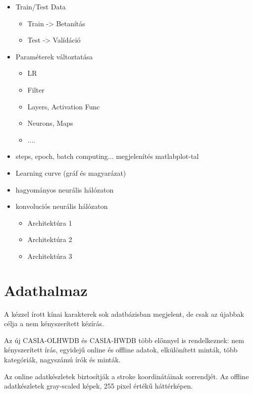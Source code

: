 
\begin{itemize}
\item Train/Test Data
	\begin{itemize}
	\item Train -> Betanítás
	\item Test -> Valídáció	
	\end{itemize}
\end{itemize}

\begin{itemize}
\item Paraméterek változtatása
	\begin{itemize}
	\item LR
	\item Filter
	\item Layers, Activation Func
	\item Neurons, Maps
	\item ....
	\end{itemize}
\item steps, epoch, batch computing... megjelenítés matlabplot-tal
\item Learning curve (gráf és magyarázat)
\end{itemize}

\begin{itemize}
\item hagyományos neurális hálózaton
\item konvoluciós neurális hálózaton
	\begin{itemize}
	\item Architektúra 1
	\item Architektúra 2
	\item Architektúra 3
	\end{itemize}
\end{itemize}

\section{Adathalmaz}

A kézzel írott kínai karakterek sok adatbázisban megjelent, de csak az újabbak célja a nem kényszerített kézírás.


Az új CASIA-OLHWDB és CASIA-HWDB több előnnyel is rendelkeznek: nem kényszerített írás, egyidejű online és offline adatok, elkülönített minták, több kategóriák, nagyszámú írók és minták.

Az online adatkészletek biztosítják a stroke koordinátáinak sorrendjét. Az offline adatkészletek gray-scaled képek, 255 pixel értékű háttérképen.
